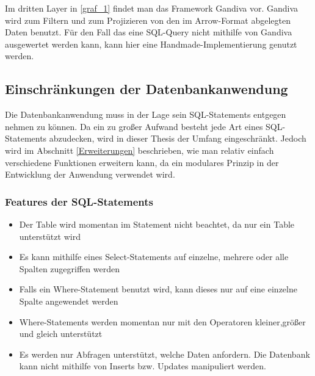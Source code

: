 Im dritten Layer in \ref{graf_1} findet man das Framework Gandiva vor. 
Gandiva wird zum Filtern und zum Projizieren von den im Arrow-Format abgelegten Daten benutzt. Für den Fall das eine SQL-Query nicht mithilfe von Gandiva ausgewertet werden kann, kann hier eine Handmade-Implementierung genutzt werden.

\subsection{Einschränkungen der Datenbankanwendung}

Die Datenbankanwendung muss in der Lage sein SQL-Statements entgegen nehmen zu können. Da ein zu großer Aufwand besteht jede Art eines SQL-Statements abzudecken, wird in dieser Thesis der Umfang eingeschränkt. Jedoch wird im Abschnitt \ref{Erweiterungen} beschrieben, wie man relativ einfach verschiedene Funktionen erweitern kann, da ein modulares Prinzip in der Entwicklung der Anwendung verwendet wird.

\subsubsection{Features der SQL-Statements}

\begin{itemize}
\item Der Table wird momentan im Statement nicht beachtet, da nur ein Table unterstützt wird 
 \item Es kann mithilfe eines Select-Statements auf einzelne, mehrere oder alle Spalten zugegriffen werden
 \item Falls ein Where-Statement benutzt wird, kann dieses nur auf eine einzelne Spalte angewendet werden
 \item Where-Statements werden momentan nur mit den Operatoren kleiner,größer und gleich unterstützt
 \item Es werden nur Abfragen unterstützt, welche Daten anfordern. Die Datenbank kann nicht mithilfe von Inserts bzw. Updates manipuliert werden.
\end{itemize}

